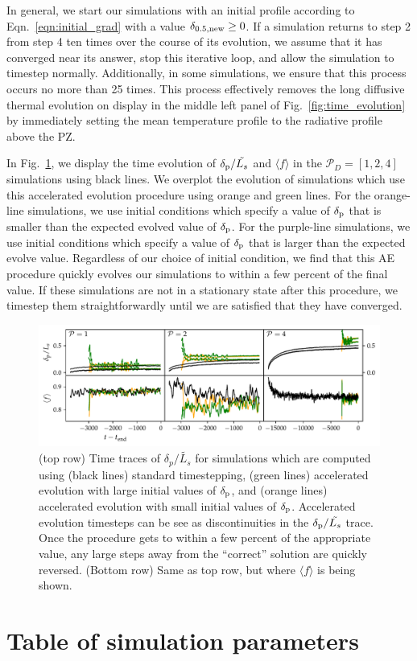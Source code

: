 \documentclass{aastex631}
\newcommand{\delp}{\ensuremath{\delta_{\rm{p}}}}
\newcommand{\mP}{\ensuremath{\mathcal{P}}}
\newcommand{\angles}[1]{\langle #1 \rangle}
\begin{document}
In general, we start our simulations with an initial profile according to Eqn.~\ref{eqn:initial_grad} with a value $\delta_{0.5,\rm{new}} \geq 0$.
If a simulation returns to step 2 from step 4 ten times over the course of its evolution, we assume that it has converged near its answer, stop this iterative loop, and allow the simulation to timestep normally.
Additionally, in some simulations, we ensure that this process occurs no more than 25 times.
This process effectively removes the long diffusive thermal evolution on display in the middle left panel of Fig.~\ref{fig:time_evolution} by immediately setting the mean temperature profile to the radiative profile above the PZ.

In Fig.~\ref{fig:AE_time_figure}, we display the time evolution of $\delp/\tilde{L_s}$ and $\angles{f}$ in the $\mP_D = [1,2,4]$ simulations using black lines.
We overplot the evolution of simulations which use this accelerated evolution procedure using orange and green lines.
For the orange-line simulations, we use initial conditions which specify a value of $\delp$ that is smaller than the expected evolved value of $\delp$.
For the purple-line simulations, we use initial conditions which specify a value of $\delp$ that is larger than the expected evolve value.
Regardless of our choice of initial condition, we find that this AE procedure quickly evolves our simulations to within a few percent of the final value.
If these simulations are not in a stationary state after this procedure, we timestep them straightforwardly until we are satisfied that they have converged.

\begin{figure}[t!]
\centering
\includegraphics[width=\textwidth]{AE_time_figure.pdf}
\caption{
\label{fig:AE_time_figure}
(top row) Time traces of $\delta_p/\tilde{L_s}$ for simulations which are computed using (black lines) standard timestepping, (green lines) accelerated evolution with large initial values of $\delp$, and (orange lines) accelerated evolution with small initial values of $\delp$.
Accelerated evolution timesteps can be see as discontinuities in the $\delp/\tilde{L_s}$ trace.
Once the procedure gets to within a few percent of the appropriate value, any large steps away from the ``correct'' solution are quickly reversed.
(Bottom row) Same as top row, but where $\angles{f}$ is being shown.
}
\end{figure}



\section{Table of simulation parameters}
\label{app:simulation_table}







\end{document}
